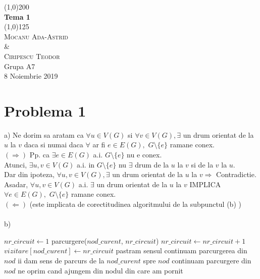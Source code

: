 \documentclass{article}
\begin{document}
\begin{titlepage}
	\begin{center}
	\line(1,0){200} \\
	[0.25 in]
	\huge{\bfseries Tema 1} \\
	[2mm]
	\line(1,0){125}\\
	[1.5cm]
	\textsc{\LARGE Mocanu Ada-Astrid\\ \& \\Ciripescu Teodor}\\
	[5mm]
	Grupa A7\\
	[10mm]
	\LARGE 8 Noiembrie 2019\\
	\end{center}
\end{titlepage}



\newpage
\section*{Problema 1}
\Large
a) Ne dorim sa aratam ca $\forall u\in V(G)$ si $\forall v\in V(G), \exists$ un drum orientat de la $u$ la $v$ daca si numai daca $\forall$ ar fi $e\in E(G), $ $G\setminus \{ e\}$ ramane conex.
 \bigskip\\
 $(\Rightarrow)$ Pp. ca $\exists e\in E(G)$ a.i. $G\setminus \{ e\}$ nu e conex.
  \bigskip\\
Atunci, $\exists u,v\in V(G)$ a.i. in $G\setminus \{ e\}$ nu $\exists$ drum de la $u$ la $v$ si de la $v$ la $u$.
 \bigskip\\
Dar din ipoteza, $\forall u,v\in V(G), \exists$ un drum orientat de la $u$ la $v \Rightarrow$ Contradictie.
\bigskip\\
Asadar, $\forall u,v \in V(G)$ a.i. $\exists$ un drum orientat de la $u$ la $v$ IMPLICA $\forall e\in E(G),$ $G\setminus \{ e\}$ ramane conex.
 \bigskip\\
 $(\Leftarrow)$  (este implicata de corectitudinea algoritmului de la subpunctul (b) )\\
 \bigskip\\
 b)
\begin{algorithm}
\begin{algorithmic}[1]
\State $nr\_circuit \gets \textit{$1$}$
		\State parcurgere($nod\_curent$, $nr\_circuit$) 
		\State $nr\_circuit \gets \textit{$nr\_circuit + 1$}$ 
	\EndIf
\EndFor
\EndProcedure
{}
\State $vizitare[nod\_curent] \gets \textit{$nr\_circuit$}$
		\State pastram sensul
		\State continuam parcurgerea din $nod$
	\Else{} 
		\State ii dam sens de parcurs de la $nod\_curent$ spre $nod$
		\State continuam parcurgere din $nod$
		\EndIf
	\EndIf
\EndFor
\State ne oprim cand ajungem din nodul din care am pornit
\EndProcedure
\end{algorithmic}
\end{algorithm}
\end{document}
